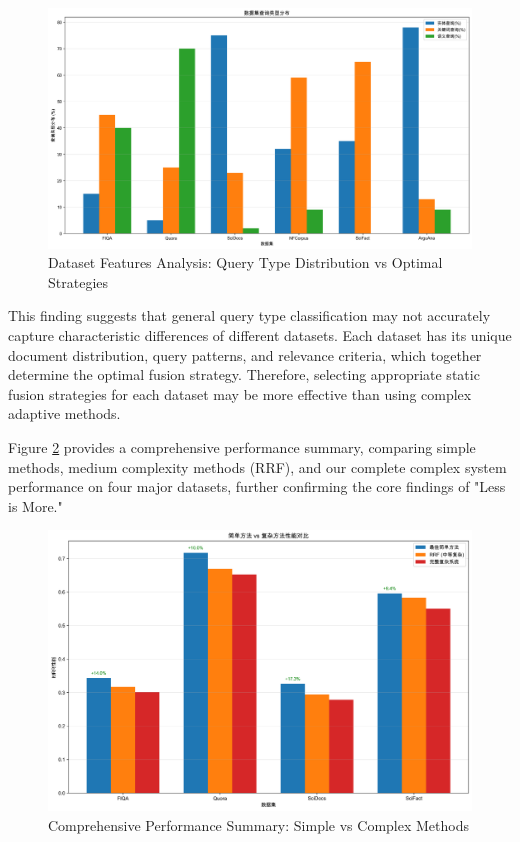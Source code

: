 \documentclass[letterpaper]{article} %
\begin{document}
\begin{figure}[t]
\centering
\includegraphics[width=0.8\columnwidth]{charts/dataset_features_analysis.png}
\caption{Dataset Features Analysis: Query Type Distribution vs Optimal Strategies}
\label{fig:dataset_analysis}
\end{figure}

This finding suggests that general query type classification may not accurately capture characteristic differences of different datasets. Each dataset has its unique document distribution, query patterns, and relevance criteria, which together determine the optimal fusion strategy. Therefore, selecting appropriate static fusion strategies for each dataset may be more effective than using complex adaptive methods.

Figure \ref{fig:summary} provides a comprehensive performance summary, comparing simple methods, medium complexity methods (RRF), and our complete complex system performance on four major datasets, further confirming the core findings of "Less is More."

\begin{figure}[t]
\centering
\includegraphics[width=0.8\columnwidth]{charts/simple_vs_complex_summary.png}
\caption{Comprehensive Performance Summary: Simple vs Complex Methods}
\label{fig:summary}
\end{figure}
\end{document}
